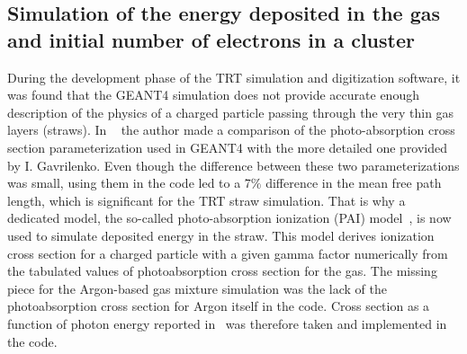 \subsection{Simulation of the energy deposited in the gas and initial number of electrons in a cluster}
\label{subsec:pai_model}
During the development phase of the TRT simulation and digitization software, it was found that the GEANT4 simulation does not provide accurate enough description of the physics
of a charged particle passing through the very thin gas layers (straws). 
In ~\cite{kittelmann_thesis} the author made a comparison of the photo-absorption cross section parameterization used in GEANT4 with the more detailed one provided by I. Gavrilenko.
Even though the difference between these two parameterizations was small, using them in the code led to a 7$\%$ difference in the mean free path length, which is significant for the TRT straw simulation.
That is why a dedicated model, the so-called photo-absorption ionization (PAI) model~\cite{pai_model_paper}, is now used to simulate deposited energy in the straw.
This model derives ionization cross section for a charged particle with a given gamma factor numerically from the tabulated values of photoabsorption cross section for the gas.
The missing piece for the Argon-based gas mixture simulation was the lack of the photoabsorption cross section for Argon itself in the code.
Cross section as a function of photon energy reported in~\cite{argon_cross_section} was therefore taken and implemented in the code.

